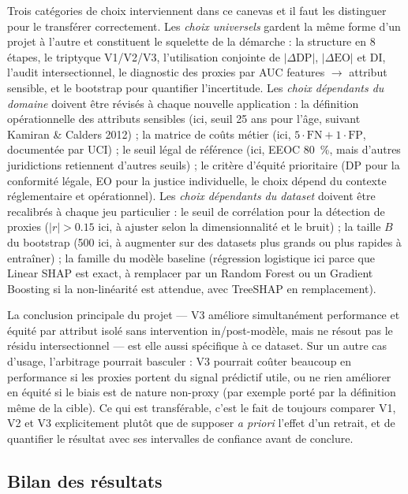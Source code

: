 \documentclass[11pt, a4paper]{article}
\begin{document}
Trois catégories de choix interviennent dans ce canevas et il faut les distinguer pour le transférer correctement. Les \emph{choix universels} gardent la même forme d'un projet à l'autre et constituent le squelette de la démarche : la structure en 8 étapes, le triptyque V1/V2/V3, l'utilisation conjointe de $|\Delta\text{DP}|$, $|\Delta\text{EO}|$ et DI, l'audit intersectionnel, le diagnostic des proxies par AUC features $\to$ attribut sensible, et le bootstrap pour quantifier l'incertitude. Les \emph{choix dépendants du domaine} doivent être révisés à chaque nouvelle application : la définition opérationnelle des attributs sensibles (ici, seuil 25 ans pour l'âge, suivant Kamiran \& Calders 2012) ; la matrice de coûts métier (ici, $5 \cdot \text{FN} + 1 \cdot \text{FP}$, documentée par UCI) ; le seuil légal de référence (ici, EEOC 80~\%, mais d'autres juridictions retiennent d'autres seuils) ; le critère d'équité prioritaire (DP pour la conformité légale, EO pour la justice individuelle, le choix dépend du contexte réglementaire et opérationnel). Les \emph{choix dépendants du dataset} doivent être recalibrés à chaque jeu particulier : le seuil de corrélation pour la détection de proxies ($|r| > 0.15$ ici, à ajuster selon la dimensionnalité et le bruit) ; la taille $B$ du bootstrap (500 ici, à augmenter sur des datasets plus grands ou plus rapides à entraîner) ; la famille du modèle baseline (régression logistique ici parce que Linear SHAP est exact, à remplacer par un Random Forest ou un Gradient Boosting si la non-linéarité est attendue, avec TreeSHAP en remplacement).

La conclusion principale du projet --- V3 améliore simultanément performance et équité par attribut isolé sans intervention in/post-modèle, mais ne résout pas le résidu intersectionnel --- est elle aussi spécifique à ce dataset. Sur un autre cas d'usage, l'arbitrage pourrait basculer : V3 pourrait coûter beaucoup en performance si les proxies portent du signal prédictif utile, ou ne rien améliorer en équité si le biais est de nature non-proxy (par exemple porté par la définition même de la cible). Ce qui est transférable, c'est le fait de toujours comparer V1, V2 et V3 explicitement plutôt que de supposer \emph{a priori} l'effet d'un retrait, et de quantifier le résultat avec ses intervalles de confiance avant de conclure.

\subsection{Bilan des résultats}
\end{document}
